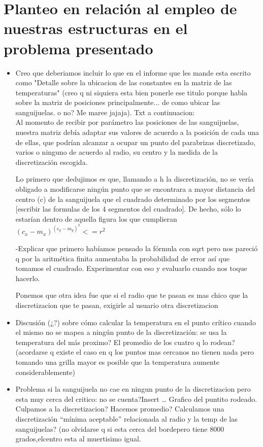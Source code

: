 \documentclass[double,12pt]{beavtex}
\begin{document}
\section{Planteo en relaci\'on al empleo de nuestras estructuras en el problema presentado}{
{\color{red}
\begin{itemize}
 \item Creo que deberiamos incluir lo que en el informe que les mande esta escrito como "Detalle sobre la ubicacion de las constantes en la matriz de las temperaturas" (creo q ni siquiera esta bien ponerle ese titulo porque habla sobre la matriz de posiciones principalmente... de como ubicar las sanguijuelas. o no? Me maree jajaja). Txt a continuacion: \\
Al momento de recibir por par\'ametro las posiciones de las sanguijuelas, nuestra matriz deb\'ia adaptar sus valores de acuerdo a la posici\'on de cada una de ellas, que podr\'ian alcanzar a ocupar un punto del parabrizas discretizado, varios o ninguno de acuerdo al radio, su centro y la medida de la discretizaci\'on escogida. 

Lo primero que dedujimos es que, llamando a h la discretizaci\'on, no se ver\'ia obligado a modificarse ning\'un punto que se encontrara a mayor distancia del centro (c) de la sanguijuela que el cuadrado determinado por los segmentos [escribir las formulas de los 4 segmentos del cuadrado]. De hecho, s\'olo lo estar\'ian dentro de aquella figura los que cumplieran$ (c_x-m_x)^(c_y-m_y)^2<=r^2$

-Explicar que primero hab\'iamos pensado la f\'ormula con sqrt pero nos pareci\'o q por la aritm\'etica finita aumentaba la probabilidad de error as\'i que tomamos el cuadrado. Experimentar con eso y evaluarlo cuando nos toque hacerlo.

Ponemos que otra idea fue que si el radio que te pasan es mas chico que la discretizacion que te pasan, exigirle al usuario otra discretizacion 

\item  Discusi\'on (¿?) sobre c\'omo calcular la temperatura en el punto cr\'itico cuando el mismo no se mapea a ning\'un punto de la discretizaci\'on: se usa la temperatura del m\'as proximo? El promedio de los cuatro q lo rodean? (acordarse q existe el caso en q los puntos mas cercanos no tienen nada pero tomando una grilla mayor es posible que la temperatura aumente considerablemente)


\item Problema si la sanguijuela no cae en ningun punto de la discretizacion pero esta muy cerca del critico: no se cuenta?Insert … Grafico del puntito rodeado. Culpamos a la discretizacion? Hacemos promedio? Calculamos una discretizaci\'on “m\'inima aceptable” relacionada al radio y la temp de las sanguijuelas? (no olvidarse q si esta cerca del bordepero tiene 8000 grados,elcentro esta al muertisimo igual.
\end{itemize}
}



}
\end{document}
